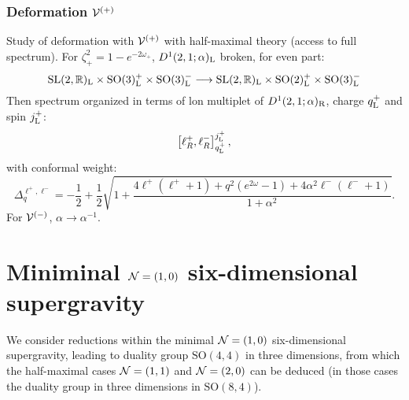\documentclass[11pt]{article}
\newcommand{\SO}{\ensuremath{\mathrm{SO}}\xspace}
\newcommand{\SL}{\ensuremath{\mathrm{SL}}\xspace}
\begin{document}
  \subsubsection{Deformation \texorpdfstring{${\cal V}^{(+)}$}{V+}}
  Study of deformation with ${\cal V}^{(+)}$ with half-maximal theory (access to full spectrum). For $\zeta^{2}_{+}=1-e^{-2\omega_{+}}$, $D^{1}(2,1;\alpha)_{\rm L}$ broken, for even part:
  \begin{equation}
    \SL(2,\mathbb{R})_{\rm L}\times\SO(3)^{+}_{\rm L}\times\SO(3)^{-}_{\rm L} \longrightarrow \SL(2,\mathbb{R})_{\rm L}\times\SO(2)^{+}_{\rm L}\times\SO(3)^{-}_{\rm L}
  \end{equation}
  Then spectrum organized in terms of lon multiplet of $D^{1}(2,1;\alpha)_{\rm R}$, charge $q_{\rm L}^{+}$ and spin $j_{\rm L}^{+}$:
  \begin{equation}
    \left[\ell^{+}_{R},\ell^{-}_{R}\right]^{j_{\rm L}^{+}}_{q_{\rm L}^{+}},
  \end{equation}
  with conformal weight:
  \begin{equation}
    \Delta_{q}^{\ell^{+},\ell^{-}} = -\frac{1}{2} + \frac{1}{2}\sqrt{1+\frac{4\ell^{+}(\ell^{+}+1)+q^{2}(e^{2\omega}-1)+4\alpha^{2}\ell^{-}(\ell^{-}+1)}{1+\alpha^{2}}}.
  \end{equation}
  For ${\cal V}^{(-)}$, $\alpha\rightarrow\alpha^{-1}$.

\appendix

\section{Miniminal ${\cal N}=(1,0)$ six-dimensional supergravity}
We consider reductions within the minimal ${\cal N}=(1,0)$ six-dimensional supergravity, leading to duality group $\SO(4,4)$ in three dimensions, from which the half-maximal cases ${\cal N}=(1,1)$ and ${\cal N}=(2,0)$ can be deduced (in those cases the duality group in three dimensions in $\SO(8,4)$).
\end{document}
